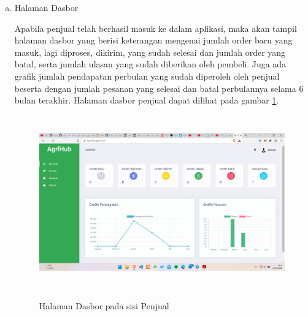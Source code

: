 \begin{enumerate}
\begin{enumerate}[a.]
		\newpage
		\item Halaman Dasbor
		\par Apabila penjual telah berhasil masuk ke dalam aplikasi, maka akan tampil halaman dasbor yang berisi keterangan mengenai jumlah order baru yang masuk, lagi diproses, dikirim, yang sudah selesai dan jumlah order yang batal, serta jumlah ulasan yang sudah diberikan oleh pembeli. Juga ada grafik jumlah pendapatan perbulan yang sudah diperoleh oleh penjual beserta dengan jumlah pesanan yang selesai dan batal perbulannya selama 6 bulan terakhir. Halaman dasbor penjual dapat dilihat pada gambar \ref*{dashboard_penjual}.
		\begin{figure}[H]
			\centering
			{\includegraphics [width = 13cm, height= 7.5cm]{gambar/penjual/dashboard_penjual}}
			\caption{Halaman Dasbor pada sisi Penjual}
			\label{dashboard_penjual}
		\end{figure}


\end{enumerate}
\end{enumerate}
